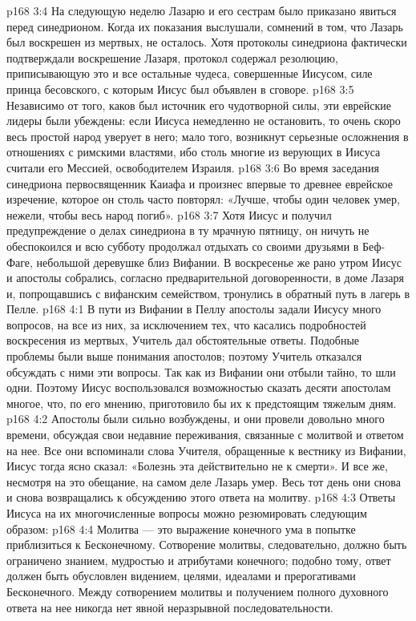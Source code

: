 \vs p168 3:4 На следующую неделю Лазарю и его сестрам было приказано явиться перед синедрионом. Когда их показания выслушали, сомнений в том, что Лазарь был воскрешен из мертвых, не осталось. Хотя протоколы синедриона фактически подтверждали воскрешение Лазаря, протокол содержал резолюцию, приписывающую это и все остальные чудеса, совершенные Иисусом, силе принца бесовского, с которым Иисус был объявлен в сговоре.
\vs p168 3:5 Независимо от того, каков был источник его чудотворной силы, эти еврейские лидеры были убеждены: если Иисуса немедленно не остановить, то очень скоро весь простой народ уверует в него; мало того, возникнут серьезные осложнения в отношениях с римскими властями, ибо столь многие из верующих в Иисуса считали его Мессией, освободителем Израиля.
\vs p168 3:6 Во время заседания синедриона первосвященник Каиафа и произнес впервые то древнее еврейское изречение, которое он столь часто повторял: «Лучше, чтобы один человек умер, нежели, чтобы весь народ погиб».
\vs p168 3:7 Хотя Иисус и получил предупреждение о делах синедриона в ту мрачную пятницу, он ничуть не обеспокоился и всю субботу продолжал отдыхать со своими друзьями в Беф\hyp{}Фаге, небольшой деревушке близ Вифании. В воскресенье же рано утром Иисус и апостолы собрались, согласно предварительной договоренности, в доме Лазаря и, попрощавшись с вифанским семейством, тронулись в обратный путь в лагерь в Пелле.
\vs p168 4:1 В пути из Вифании в Пеллу апостолы задали Иисусу много вопросов, на все из них, за исключением тех, что касались подробностей воскресения из мертвых, Учитель дал обстоятельные ответы. Подобные проблемы были выше понимания апостолов; поэтому Учитель отказался обсуждать с ними эти вопросы. Так как из Вифании они отбыли тайно, то шли одни. Поэтому Иисус воспользовался возможностью сказать десяти апостолам многое, что, по его мнению, приготовило бы их к предстоящим тяжелым дням.
\vs p168 4:2 Апостолы были сильно возбуждены, и они провели довольно много времени, обсуждая свои недавние переживания, связанные с молитвой и ответом на нее. Все они вспоминали слова Учителя, обращенные к вестнику из Вифании, Иисус тогда ясно сказал: «Болезнь эта действительно не к смерти». И все же, несмотря на это обещание, на самом деле Лазарь умер. Весь тот день они снова и снова возвращались к обсуждению этого ответа на молитву.
\vs p168 4:3 Ответы Иисуса на их многочисленные вопросы можно резюмировать следующим образом:
\vs p168 4:4 \bibnobreakspace Молитва --- это выражение конечного ума в попытке приблизиться к Бесконечному. Сотворение молитвы, следовательно, должно быть ограничено знанием, мудростью и атрибутами конечного; подобно тому, ответ должен быть обусловлен видением, целями, идеалами и прерогативами Бесконечного. Между сотворением молитвы и получением полного духовного ответа на нее никогда нет явной неразрывной последовательности.
